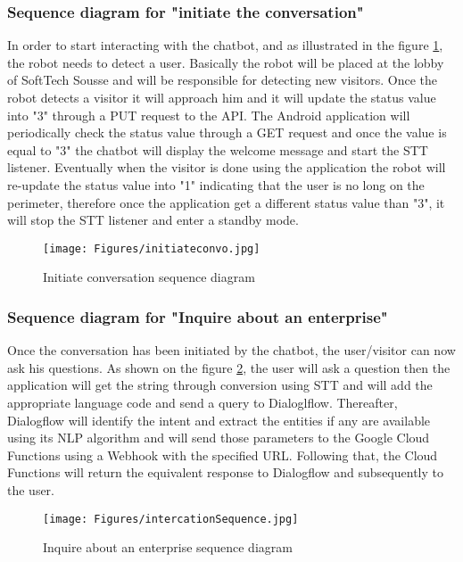 \subsubsection{Sequence diagram for "initiate the conversation"}
In order to start interacting with the chatbot, and as illustrated in the figure \ref{fig:seq diag converstaion}, the robot needs to detect a user. Basically the robot will be placed at the lobby of SoftTech Sousse and will be responsible for detecting new visitors. Once the robot detects a visitor it will approach him and it will update the status value into "3" through a PUT request to the API. The Android application will periodically check the status value through a GET request and once the value is equal to "3" the chatbot will display the welcome message and start the STT listener. Eventually when the visitor is done using the application the robot will re-update the status value into "1" indicating that the user is no long on the perimeter, therefore once the application get a different status value than "3", it will stop the STT listener and enter a standby mode.
\begin{figure}[H]
\centering
\texttt{[image: Figures/initiateconvo.jpg]}
\caption{Initiate conversation sequence diagram}
\label{fig:seq diag converstaion}
\end{figure}

\subsubsection{Sequence diagram for "Inquire about an enterprise"}
Once the conversation has been initiated by the chatbot, the user/visitor can now ask his questions. As shown on the figure \ref{fig:seq inquire}, the user will ask a question then the application will get the string through conversion using STT and will add the appropriate language code and send a query to Dialoglflow. Thereafter, Dialogflow will identify the intent and extract the entities if any are available using its NLP algorithm and will send those parameters to the Google Cloud Functions using a Webhook with the specified URL. Following that, the Cloud Functions will return the equivalent response to Dialogflow and subsequently to the user.
\begin{figure}[H]
\centering
\texttt{[image: Figures/intercationSequence.jpg]}
\caption{Inquire about an enterprise sequence diagram}
\label{fig:seq inquire}
\end{figure}
